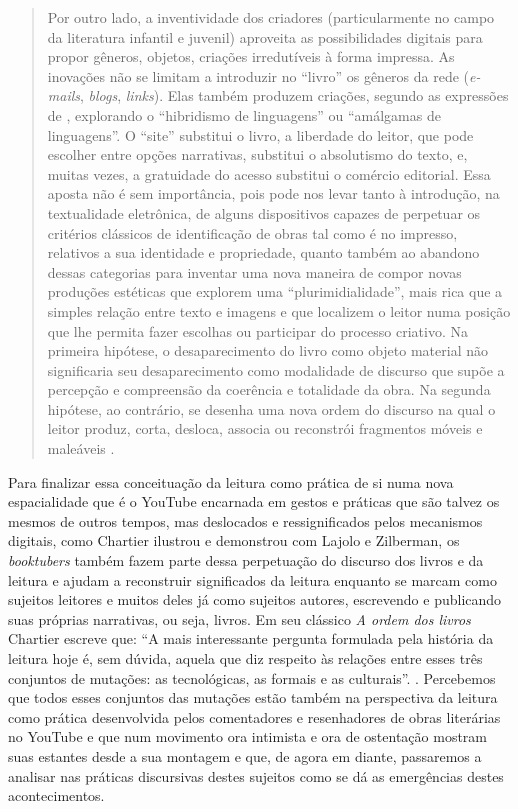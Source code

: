 \begin{quote}
Por outro lado, a inventividade dos criadores (particularmente no campo
da literatura infantil e juvenil) aproveita as possibilidades digitais
para propor gêneros, objetos, criações irredutíveis à forma impressa. As
inovações não se limitam a introduzir no \enquote{livro} os gêneros da rede
(\textit{e-mails}, \textit{blogs}, \textit{links}). Elas também produzem criações, segundo as
expressões de \textcite{lajolo_literatura_2017}, explorando o
\enquote{hibridismo de linguagens} ou \enquote{amálgamas de linguagens}. O \enquote{site} substitui o livro, a liberdade do leitor, que pode escolher entre opções narrativas, substitui o absolutismo do texto, e, muitas vezes, a
gratuidade do acesso substitui o comércio editorial. Essa aposta não é
sem importância, pois pode nos levar tanto à introdução, na textualidade
eletrônica, de alguns dispositivos capazes de perpetuar os critérios
clássicos de identificação de obras tal como é no impresso, relativos a
sua identidade e propriedade, quanto também ao abandono dessas
categorias para inventar uma nova maneira de compor novas produções
estéticas que explorem uma \enquote{plurimidialidade}, mais rica que a simples
relação entre texto e imagens e que localizem o leitor numa posição que
lhe permita fazer escolhas ou participar do processo criativo. Na
primeira hipótese, o desaparecimento do livro como objeto material não
significaria seu desaparecimento como modalidade de discurso que supõe a
percepção e compreensão da coerência e totalidade da obra. Na segunda
hipótese, ao contrário, se desenha uma nova ordem do discurso na qual o
leitor produz, corta, desloca, associa ou reconstrói fragmentos móveis e
maleáveis \cite[p. 14–15]{chartier2019lersem}.
\end{quote}

Para finalizar essa conceituação da leitura como prática de si numa nova
espacialidade que é o YouTube encarnada em gestos e práticas que são
talvez os mesmos de outros tempos, mas deslocados e ressignificados
pelos mecanismos digitais, como Chartier ilustrou e demonstrou com
Lajolo e Zilberman, os \textit{booktubers} também fazem parte dessa
perpetuação do discurso dos livros e da leitura e ajudam a reconstruir
significados da leitura enquanto se marcam como sujeitos leitores e
muitos deles já como sujeitos autores, escrevendo e publicando suas
próprias narrativas, ou seja, livros. Em seu clássico \textit{A ordem dos
livros} Chartier escreve que: \enquote{A mais interessante pergunta formulada
pela história da leitura hoje é, sem dúvida, aquela que diz respeito às
relações entre esses três conjuntos de mutações: as tecnológicas, as
formais e as culturais}. \cite[p. 24]{chartier1999ordem}. Percebemos que todos
esses conjuntos das mutações estão também na perspectiva da leitura como
prática desenvolvida pelos comentadores e resenhadores de obras
literárias no YouTube e que num movimento ora intimista e ora de
ostentação mostram suas estantes desde a sua montagem e que, de agora em
diante, passaremos a analisar nas práticas discursivas destes sujeitos
como se dá as emergências destes acontecimentos.

